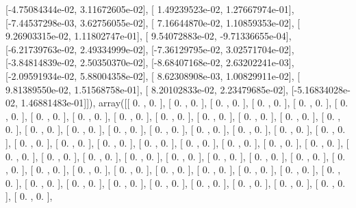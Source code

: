 \documentclass{article}
\begin{document}
       [-4.75084344e-02,  3.11672605e-02],
       [ 1.49239523e-02,  1.27667974e-01],
       [-7.44537298e-03,  3.62756055e-02],
       [ 7.16644870e-02,  1.10859353e-02],
       [ 9.26903315e-02,  1.11802747e-01],
       [ 9.54072883e-02, -9.71336655e-04],
       [-6.21739763e-02,  2.49334999e-02],
       [-7.36129795e-02,  3.02571704e-02],
       [-3.84814839e-02,  2.50350370e-02],
       [-8.68407168e-02,  2.63202241e-03],
       [-2.09591934e-02,  5.88004358e-02],
       [ 8.62308908e-03,  1.00829911e-02],
       [ 9.81389550e-02,  1.51568758e-01],
       [ 8.20102833e-02,  2.23479685e-02],
       [-5.16834028e-02,  1.46881483e-01]]), array([[ 0.        ,  0.        ],
       [ 0.        ,  0.        ],
       [ 0.        ,  0.        ],
       [ 0.        ,  0.        ],
       [ 0.        ,  0.        ],
       [ 0.        ,  0.        ],
       [ 0.        ,  0.        ],
       [ 0.        ,  0.        ],
       [ 0.        ,  0.        ],
       [ 0.        ,  0.        ],
       [ 0.        ,  0.        ],
       [ 0.        ,  0.        ],
       [ 0.        ,  0.        ],
       [ 0.        ,  0.        ],
       [ 0.        ,  0.        ],
       [ 0.        ,  0.        ],
       [ 0.        ,  0.        ],
       [ 0.        ,  0.        ],
       [ 0.        ,  0.        ],
       [ 0.        ,  0.        ],
       [ 0.        ,  0.        ],
       [ 0.        ,  0.        ],
       [ 0.        ,  0.        ],
       [ 0.        ,  0.        ],
       [ 0.        ,  0.        ],
       [ 0.        ,  0.        ],
       [ 0.        ,  0.        ],
       [ 0.        ,  0.        ],
       [ 0.        ,  0.        ],
       [ 0.        ,  0.        ],
       [ 0.        ,  0.        ],
       [ 0.        ,  0.        ],
       [ 0.        ,  0.        ],
       [ 0.        ,  0.        ],
       [ 0.        ,  0.        ],
       [ 0.        ,  0.        ],
       [ 0.        ,  0.        ],
       [ 0.        ,  0.        ],
       [ 0.        ,  0.        ],
       [ 0.        ,  0.        ],
       [ 0.        ,  0.        ],
       [ 0.        ,  0.        ],
       [ 0.        ,  0.        ],
       [ 0.        ,  0.        ],
       [ 0.        ,  0.        ],
       [ 0.        ,  0.        ],
       [ 0.        ,  0.        ],
       [ 0.        ,  0.        ],
       [ 0.        ,  0.        ],
       [ 0.        ,  0.        ],
       [ 0.        ,  0.        ],
       [ 0.        ,  0.        ],
       [ 0.        ,  0.        ],
       [ 0.        ,  0.        ],
       [ 0.        ,  0.        ],
       [ 0.        ,  0.        ],
\end{document}
